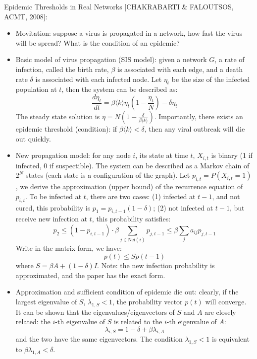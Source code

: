 \documentclass{report}
\begin{document}
\begin{enumerate}
Epidemic Thresholds in Real Networks [CHAKRABARTI \& FALOUTSOS, ACMT, 2008]: 
\begin{itemize}
\item Movitation: suppose a virus is propagated in a network, how fast the virus will be spread? What is the condition of an epidemic? 

\item Basic model of virus propagation (SIS model): given a network $G$, a rate of infection, called the birth rate, $\beta$ is associated with each edge, and a death rate $\delta$ is associated with each infected node. Let $\eta_t$ be the size of the infected population at $t$, then the system can be described as: 
\begin{equation}
\frac{d \eta_t}{dt}	= \beta \langle k \rangle \eta_t \left( 1 - \frac{\eta_t}{N}\right) - \delta \eta_t
\end{equation}
The steady state solution is $\eta = N \left(1 - \frac{\delta}{\beta \langle k \rangle} \right)$. Importantly, there exists an epidemic threshold (condition): if $\beta \langle k \rangle < \delta$, then any viral outbreak will die out quickly. 

\item New propagation model: for any node $i$, its state at time $t$, $X_{i,t}$ is binary (1 if infected, 0 if suspectible). The system can be described as a Markov chain of $2^N$ states (each state is a configuration of the graph). Let $p_{i,t} = P(X_{i,t} = 1)$, we derive the approximation (upper bound) of the recurrence equation of $p_{i,t}$. To be infected at $t$, there are two cases: (1) infected at $t - 1$, and not cured, this probability is $p_1 = p_{i,t-1} (1 - \delta)$; (2) not infected at $t-1$, but receive new infection at $t$, this probability satisfies: 
\begin{equation}
p_2 \leq (1 - p_{i,t-1}) \cdot \beta \sum_{j \in \text{Nei}(i)} p_{j,t-1}	\leq \beta \sum_j a_{ij} p_{j,t-1}
\end{equation}
Write in the matrix form, we have:  
\begin{equation}
p(t) \leq S p(t-1)
\end{equation}
where $S = \beta A + (1 - \delta) I$. Note: the new infection probability is approximated, and the paper has the exact form. 

\item Approximation and sufficient condition of epidemic die out: clearly, if the largest eigenvalue of $S$, $\lambda_{1,S} < 1$, the probability vector $p(t)$ will converge. It can be shown that the eigenvalues/eigenvectors of $S$ and $A$ are closely related: the $i$-th eigenvalue of $S$ is related to the $i$-th eigenvalue of $A$: 
\begin{equation}
\lambda_{i,S} = 1 - \delta + \beta \lambda_{i,A}	
\end{equation}
and the two have the same eigenvectors. The condition $\lambda_{1,S} < 1$ is equivalent to $\beta \lambda_{1,A} < \delta$. 


\end{itemize}
\end{enumerate}
\end{document}
